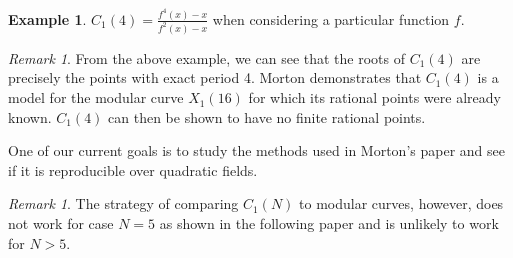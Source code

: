 \documentclass{amsart}
\theoremstyle{plain}
\theoremstyle{definition}
\newtheorem{example}[theorem]{Example}
\theoremstyle{remark}
\newtheorem{remark}[theorem]{Remark}
\begin{document}
\begin{example}
  $C_1(4) = \frac{f^4(x) - x}{f^2(x) - x}$ when considering a
  particular function $f$.
\end{example}

\begin{remark}
  From the above example, we can see that the roots of $C_1(4)$ are
  precisely the points with exact period 4. Morton demonstrates that
  $C_1(4)$ is a model for the modular curve $X_1(16)$ for which its
  rational points were already known. $C_1(4)$ can then be shown to
  have no finite rational points.
	
  One of our current goals is to study the methods used in Morton's
  paper and see if it is reproducible over quadratic fields.
\end{remark}

\begin{remark}
  The strategy of comparing $C_1(N)$ to modular curves, however, does
  not work for case $N = 5$ as shown in the following paper and is
  unlikely to work for $N > 5$.
\end{remark}
\end{document}
